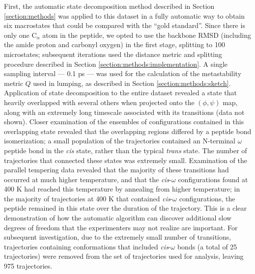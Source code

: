 First, the automatic state decomposition method described in Section \ref{section:methods} was applied to this dataset in a fully automatic way to obtain six macrostates that could be compared with the ``gold standard''.
Since there is only one C$_\alpha$ atom in the peptide, we opted to use the backbone RMSD (including the amide proton and carbonyl oxygen) in the first stage, splitting to 100 microstates; subsequent iterations used the distance metric and splitting procedure described in Section \ref{section:methods:implementation}.
A single sampling interval --- 0.1 ps --- was used for the calculation of the metastability metric $Q$ used in lumping, as described in Section \ref{section:methods:sketch}.
Application of state decomposition to the entire dataset revealed a state that heavily overlapped with several others when projected onto the $(\phi,\psi)$ map, along with an extremely long timescale associated with its transitions (data not shown).
Closer examination of the ensembles of configurations contained in this overlapping state revealed that the overlapping regions differed by a peptide bond isomerization; a small population of the trajectories contained an N-terminal $\omega$ peptide bond in the \emph{cis} state, rather than the typical \emph{trans} state.
The number of trajectories that connected these states was extremely small.
Examination of the parallel tempering data revealed that the majority of these transitions had occurred at much higher temperature, and that the \emph{cis}-$\omega$ configurations found at 400 K had reached this temperature by annealing from higher temperature; in the majority of trajectories at 400 K that contained \emph{cis}-$\omega$ configurations, the peptide remained in this state over the duration of the trajectory.
This is a clear demonstration of how the automatic algorithm can discover additional slow degrees of freedom that the experimenters may not realize are important.
For subsequent investigation, due to the extremely small number of transitions, trajectories containing conformations that included \emph{cis}-$\omega$ bonds (a total of 25 trajectories) were removed from the set of trajectories used for analysis, leaving 975 trajectories.

